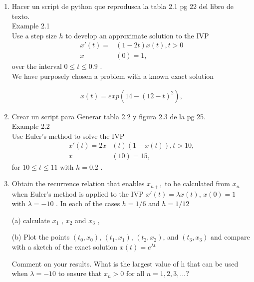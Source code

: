 \begin{enumerate}
 	\item
 	Hacer un script de python que reprodusca la tabla 2.1 pg 22 del libro de texto.	\\
 	Example 2.1\\
 	Use a step size $h$ to develop an approximate solution to the IVP
 	   \begin{align*}
 	     x'(t) = &(1 - 2t)x(t) , t>0 \\
 	     x&(0) = 1,
 	   \end{align*}
 	over the interval $0 \leq t \leq 0.9$ . \\
 	We have purposely chosen a problem with a known exact solution \
 	   
 	   \begin{align*}
	 	  x(t) = exp( 14 - ( 12 - t)^2 ), 
	   \end{align*}
 	      
 	\item
 	Crear un script para Generar tabla 2.2 y figura 2.3 de la pg 25.\\
 	Example 2.2\\
 	Use Euler’s method to solve the IVP
 	    \begin{align*}
 	    x'(t) = 2x&(t)( 1 - x(t)) , t > 10, \\
 	    x&(10) = 15, 
 	    \end{align*}    
 	for $ 10 \leq t \leq 11 $ with $h = 0.2$ .
 		
 	\item 
 	Obtain the recurrence relation that enables $ x_{n+1}$ to be calculated
 	from $x_n$ when Euler’s method is applied to the IVP  $x'(t) = \lambda x(t)$,
 	$x(0) = 1$ with $\lambda = - 10 $ . In each of the cases $h = 1/6$ and $h = 1/12$
 	\item[(a)]
 	calculate $x_1$ , $x_2$ and $x_3$ , \\
 	\item[(b)]
 	Plot the points $(t_0 , x_0 )$, $(t_1 , x_1 )$, $(t_2 , x_2 )$, and $(t_3 , x_3 )$ and compare
 	with a sketch of the exact solution  $x(t) = e^{\lambda t}$ 
 	
 	Comment on your results. What is the largest value of h that can be used when $\lambda = - 10 $ to ensure that $x_n > 0$ for all $n = 1, 2, 3, . . .$?
 	

\end{enumerate}
